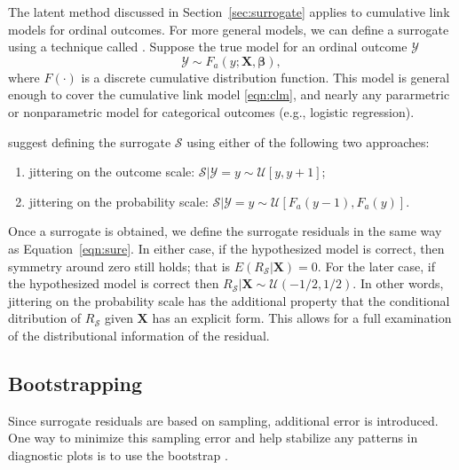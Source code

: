 The latent method discussed in Section~\ref{sec:surrogate} applies to cumulative link models for ordinal outcomes. For more general models, we can define a surrogate using a technique called . Suppose the true model for an ordinal outcome $\mathcal{Y}$
\begin{equation}
  \mathcal{Y} \sim F_a\left(y; \boldsymbol{X}, \boldsymbol{\beta}\right),
\end{equation}
where $F\left(\cdot\right)$ is a discrete cumulative distribution function. This model is general enough to cover the cumulative link model \eqref{eqn:clm}, and nearly any pararmetric or nonparametric model for categorical outcomes (e.g., logistic regression).

\citet{residuals-liu-2017} suggest defining the surrogate $\mathcal{S}$ using either of the following two approaches:
\begin{enumerate}
  \item jittering on the outcome scale: $\mathcal{S} | \mathcal{Y} = y \sim \mathcal{U}\left[y, y + 1\right]$;
  \item jittering on the probability scale: $\mathcal{S} | \mathcal{Y} = y \sim \mathcal{U}\left[F_a\left(y - 1\right), F_a\left(y\right)\right]$.
\end{enumerate}
Once a surrogate is obtained, we define the surrogate residuals in the same way as Equation~\ref{eqn:sure}.
In either case, if the hypothesized model is correct, then symmetry around zero still holds; that is $E\left(R_\mathcal{S} | \boldsymbol{X}\right) = 0$. For the later case, if the hypothesized model is correct then $R_\mathcal{S} | \boldsymbol{X} \sim \mathcal{U}\left(-1/2, 1/2\right)$. In other words, jittering on the probability scale has the additional property that the conditional ditribution of $R_\mathcal{S}$ given $\boldsymbol{X}$ has an explicit form. This allows for a full examination of the distributional information of the residual.


\subsection{Bootstrapping}

Since surrogate residuals are based on sampling, additional error is introduced. One way to minimize this sampling error and help stabilize any patterns in diagnostic plots is to use the bootstrap \citep{efron-another-1979}.

